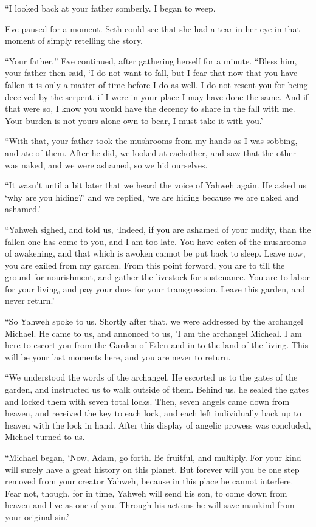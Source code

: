\documentclass[12pt,twoside,titlepage]{report}
\begin{document}
``I looked back at your father somberly. I began to weep.

Eve paused for a moment. Seth could see that she had a tear in her eye
in that moment of simply retelling the story.

``Your father,'' Eve continued, after gathering herself for a minute.
``Bless him, your father then said, `I do not want to fall, but I fear
that now that you have fallen it is only a matter of time before I do as
well. I do not resent you for being deceived by the serpent, if I were
in your place I may have done the same. And if that were so, I know you
would have the decency to share in the fall with me. Your burden is not
yours alone own to bear, I must take it with you.'

``With that, your father took the mushrooms from my hands as I was
sobbing, and ate of them. After he did, we looked at eachother, and saw
that the other was naked, and we were ashamed, so we hid ourselves.

``It wasn't until a bit later that we heard the voice of Yahweh again.
He asked us `why are you hiding?' and we replied, `we are hiding because
we are naked and ashamed.'

``Yahweh sighed, and told us, `Indeed, if you are ashamed of your
nudity, than the fallen one has come to you, and I am too late. You have
eaten of the mushrooms of awakening, and that which is awoken cannot be
put back to sleep. Leave now, you are exiled from my garden. From this
point forward, you are to till the ground for nourishment, and gather
the livestock for sustenance. You are to labor for your living, and pay
your dues for your transgression. Leave this garden, and never return.'

``So Yahweh spoke to us. Shortly after that, we were addressed by the
archangel Michael. He came to us, and annonced to us, 'I am the
archangel Micheal. I am here to escort you from the Garden of Eden and
in to the land of the living. This will be your last moments here, and
you are never to return.

``We understood the words of the archangel. He escorted us to the gates
of the garden, and instructed us to walk outside of them. Behind us, he
sealed the gates and locked them with seven total locks. Then, seven
angels came down from heaven, and received the key to each lock, and
each left individually back up to heaven with the lock in hand. After
this display of angelic prowess was concluded, Michael turned to us.

``Michael began, `Now, Adam, go forth. Be fruitful, and multiply. For
your kind will surely have a great history on this planet. But forever
will you be one step removed from your creator Yahweh, because in this
place he cannot interfere. Fear not, though, for in time, Yahweh will
send his son, to come down from heaven and live as one of you. Through
his actions he will save mankind from your original sin.'
\end{document}
